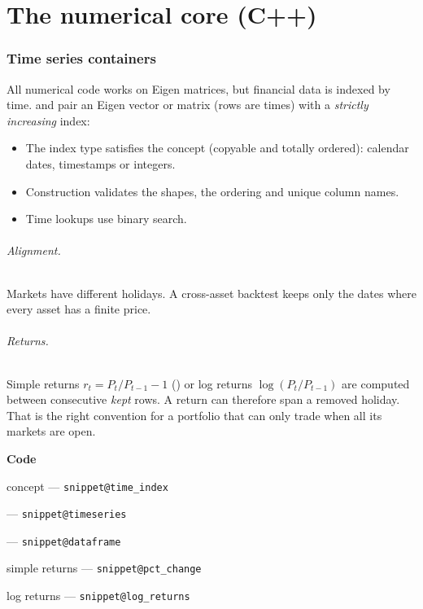 \documentclass[11pt,a4paper]{article}
\makeatletter
\newcommand{\snippetsource}[1]{\csname snippet@#1\endcsname}
\newcommand{\snippet}[3]{%
  }
\newenvironment{codepointers}{%
  \par\smallskip\begingroup\footnotesize\noindent\textcolor{blue!50!black}{\textbf{Code}}\par\nopagebreak
  \begin{list}{}{\setlength{\leftmargin}{1.2em}\setlength{\itemsep}{0pt}\setlength{\parsep}{0pt}\setlength{\topsep}{1pt}}}%
  {\end{list}\endgroup\smallskip}
\newcommand{\codeitem}[2]{\item #2 --- \texttt{\snippetsource{#1}}}
\makeatother
\begin{document}
\part{The numerical core (C++)}

\section{Time series containers}\label{sec:dataframe}

All numerical code works on Eigen matrices, but financial data is indexed by time.
 and  pair an Eigen vector or matrix (rows
are times) with a \emph{strictly increasing} index:
\begin{itemize}
  \item The index type satisfies the  concept (copyable and totally
        ordered): calendar dates, timestamps or integers.
  \item Construction validates the shapes, the ordering and unique column names.
  \item Time lookups use binary search.
\end{itemize}

\paragraph{Alignment.} Markets have different holidays. A cross-asset backtest keeps only
the dates where every asset has a finite price.

\paragraph{Returns.} Simple returns $r_t=P_t/P_{t-1}-1$ () or log returns
$\log(P_t/P_{t-1})$ are computed between consecutive \emph{kept} rows. A return can
therefore span a removed holiday. That is the right convention for a portfolio that can
only trade when all its markets are open.

\snippet{df_drop_missing}{C++}{Alignment: keep rows where every column is finite}
\begin{codepointers}
  \codeitem{time_index}{ concept}
  \codeitem{timeseries}{}
  \codeitem{dataframe}{}
  \codeitem{pct_change}{simple returns}
  \codeitem{log_returns}{log returns}
\end{codepointers}
\end{document}
